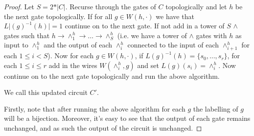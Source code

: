 \documentclass[../paper.tex]{subfiles}
\begin{document}
\begin{proof}
  Let $S = 2*\vert C \vert$. Recurse through the gates of $C$ topologically and
  let $h$ be the next gate topologically. If for all $g \in W(h, \cdot)$ we have
  that $L\vert (g)^{-1}(h) \vert = 1$ continue on to the next gate. If not add
  in a tower of $S$ $\land$ gates such that $h \rightarrow \land^h_1 \rightarrow
  \ldots \rightarrow \land^h_S$ (i.e. we have a tower of $\land$ gates with $h$
  as input to $\land^h_1$ and the output of each $\land^h_i$ connected to the
  input of each $\land^h_{i+1}$ for each $1 \leq i < S$). Now for each $g \in
  W(h, \cdot)$, if $L(g)^{-1}(h) = \{ s_0, \ldots, s_{r}\}$, for each $1 \leq i
  \leq r$ add in the wires $W(\land^h_i, g)$ and set $L(g)(s_{i}) = \land^h_i$.
  Now continue on to the next gate topologically and run the above algorithm.




  We call this updated circuit $C'$.
  
  Firstly, note that after running the above algorithm for each $g$ the
  labelling of $g$ will be a bijection. Moreover, it's easy to see that the
  output of each gate remains unchanged, and as such the output of the circuit
  is unchanged.


\end{proof}
\end{document}

